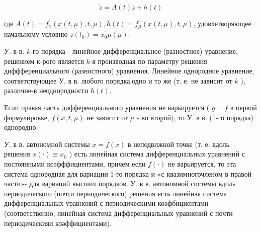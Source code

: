 \documentclass[10pt]{article}
\begin{document}
\[

\dot{z}=A(t) z+h(t)

\]



где $A(t)=f_{x}^{\prime}(x(t, \mu), t, \mu), h(t)=f_{\mu}^{\prime}(x(t, \mu), t, \mu)$, удовлетворяющее начальному условию $z\left(t_{0}\right)=x_{0}^{\prime} \mu(\mu)$.



У. в в. $k$-го порядка - линейное дифференциальное (разностное) уравнение, решением к-рого является $k$-я производная по параметру решения диффференциального (разностного) уравнения. Линейное однородное уравнение, соответствующее У. в в. любого порядка,одно и то же (т. е. не зависит от $k$ ), различие-в неоднородности $h(t)$.



Если правая часть дифференциального уравнения не варьируется ( $g=f$ в первой формулировке, $f(x, t, \mu)$ не зависит от $\mu$ - во второй), то У. в в. (1-го порядка) однородно.



У. в в. автономной системы $\dot{x}=f(x)$ в неподвижной точке (т. е. вдоль решения $x(\cdot) \equiv x_{0}$ ) есть линейная система дифференциальных уравнений с постоянными коэфффициентами, причем если $f(\cdot)$ не варьируется, то эта система однородная для вариации 1-го порядка и «с квазимногочленом в правой части»- для вариаций высших порядков. У. в в. автономной системы вдоль периодического (почти периодического) решения есть линейная система дифференциальных уравнений с периодическими коәфбициентами (соответственно, линейная система дифференциальных уравнений с почти периодическияи коәффициентами).
\end{document}

